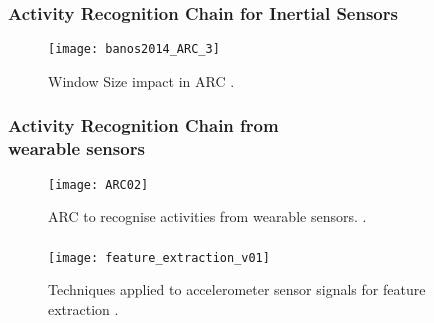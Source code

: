 \documentclass{beamer}
\begin{document}
\begin{frame}
\frametitle{Activity Recognition Chain for Inertial Sensors}
\vspace{-0.7cm}


\begin{figure}[!htb]
\centering    
\texttt{[image: banos2014\_ARC\_3]}
\caption[PA]{Window Size impact in ARC
 \textcolor{red}{\textbf{ \cite{Banos2014} }}.
}  
\label{fig:sn}
\end{figure}



\end{frame}






\begin{frame}
\frametitle{Activity Recognition Chain  from \\ wearable sensors}
\vspace{-0.7cm}


\begin{figure}[!htb]
\centering    
\texttt{[image: ARC02]}
\caption[PA]{ARC to recognise activities from wearable sensors.
 \textcolor{red}{\textbf{ \cite{Bulling2014} }}.
}  
\label{fig:sn}
\end{figure}



\end{frame}







\begin{frame}
\frametitle{}
\vspace{-2mm}


\begin{figure}[!htb]
\centering    
\texttt{[image: feature\_extraction\_v01]}
\caption[PA]{Techniques applied to accelerometer sensor signals for feature extraction 
\textcolor{red}{\textbf{ \cite{Figo2010,Liao2015,Gupta2014,Fish2012,Zhang2011} }}.
}  
\label{fig:sn}
\end{figure}



\end{frame}
\end{document}
